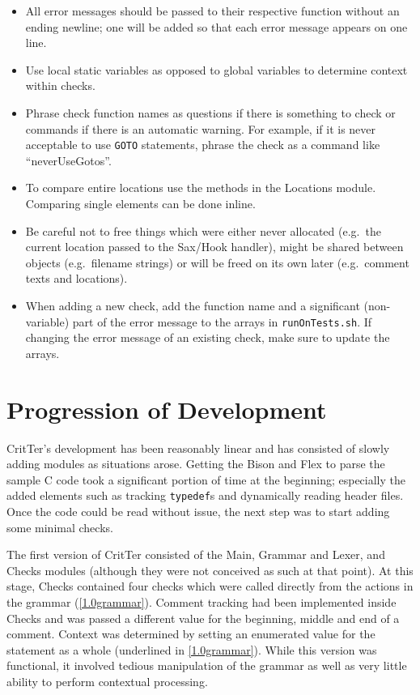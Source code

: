 \documentclass[12pt]{report}
\newcommand{\programName}{CritTer\xspace}
\begin{document}
\begin{itemize}
\item All error messages should be passed to their respective function without an ending newline; one 
will be added so that each error message appears on one line.
\item Use local static variables as opposed to global variables to determine context within checks.
\item Phrase check function names as questions if there is something to check or commands if there is an automatic warning. For example, if it is never acceptable to use \lstinline{GOTO} statements, phrase the check as a command like ``neverUseGotos''.
\item To compare entire locations use the methods in the Locations module. Comparing single elements can be done inline. 
\item Be careful not to free things which were either never allocated (e.g.\ the current location passed to the Sax\slash Hook handler), might be shared between objects (e.g.\ filename strings) or will be freed on its own later (e.g.\ comment texts and locations).
\item When adding a new check, add the function name and a significant (non-variable) part of the error message to the arrays in \lstinline{runOnTests.sh}. If changing the error message of an existing check, make sure to update the arrays.
\end{itemize}

\chapter{Progression of Development}

\programName's development has been reasonably linear and has consisted of slowly adding modules 
as situations arose. Getting the Bison and Flex to parse the sample C code took a significant portion of 
time at the beginning; especially the added elements such as tracking \lstinline{typedef}s and 
dynamically reading header files. Once the code could be read without issue, the next step was to start 
adding some minimal checks.

The first version of \programName consisted of the Main, Grammar and Lexer, and Checks modules 
(although they were not conceived as such at that point). At this stage, Checks contained four checks 
which were called directly from the actions in the grammar (\autoref{1.0grammar}). Comment tracking 
had been implemented inside Checks and was passed a different value for the beginning, middle and 
end of a comment. Context was determined by setting an enumerated value for the statement as a whole 
(underlined in \autoref{1.0grammar}). While this version was functional, it involved tedious manipulation 
of the grammar as well as very little ability to perform contextual processing.
\end{document}
